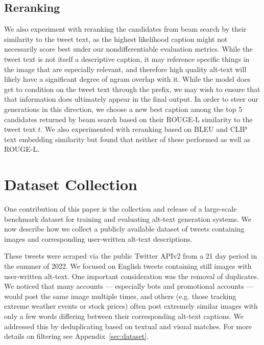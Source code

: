\documentclass{article} %
\begin{document}
\subsection{Reranking}

We also experiment with reranking the candidates from beam search by their similarity to the tweet text, as the highest likelihood caption might not necessarily score best under our nondifferentiable evaluation metrics.
While the tweet text is not itself a descriptive caption, it may reference specific things in the image that are especially relevant, and therefore high quality alt-text will likely have a significant degree of ngram overlap with it.
While the model does get to condition on the tweet text through the prefix, we may wish to ensure that that information does ultimately appear in the final output.
In order to steer our generations in this direction, we choose a new best caption among the top $5$ candidates returned by beam search based on their ROUGE-L similarity to the tweet text $t$.
We also experimented with reranking based on BLEU and CLIP text embedding similarity but found that neither of these performed as well as ROUGE-L.

\section{Dataset Collection}

One contribution of this paper is the collection and release of a large-scale benchmark dataset for training and evaluating alt-text generation systems.
We now describe how we collect a publicly available dataset of tweets containing images and corresponding user-written alt-text descriptions.

These tweets were scraped via the public Twitter APIv2 from a 21 day period in the summer of 2022.
We focused on English tweets containing still images with user-written alt-text.
One important consideration was the removal of duplicates.
We noticed that many accounts --- especially bots and promotional accounts --- would post the same image multiple times, and others (e.g. those tracking extreme weather events or stock prices) often post extremely similar images with only a few words differing between their corresponding alt-text captions.
We addressed this by deduplicating based on textual and visual matches.
For more details on filtering see Appendix~\ref{sec:dataset}.
\end{document}
